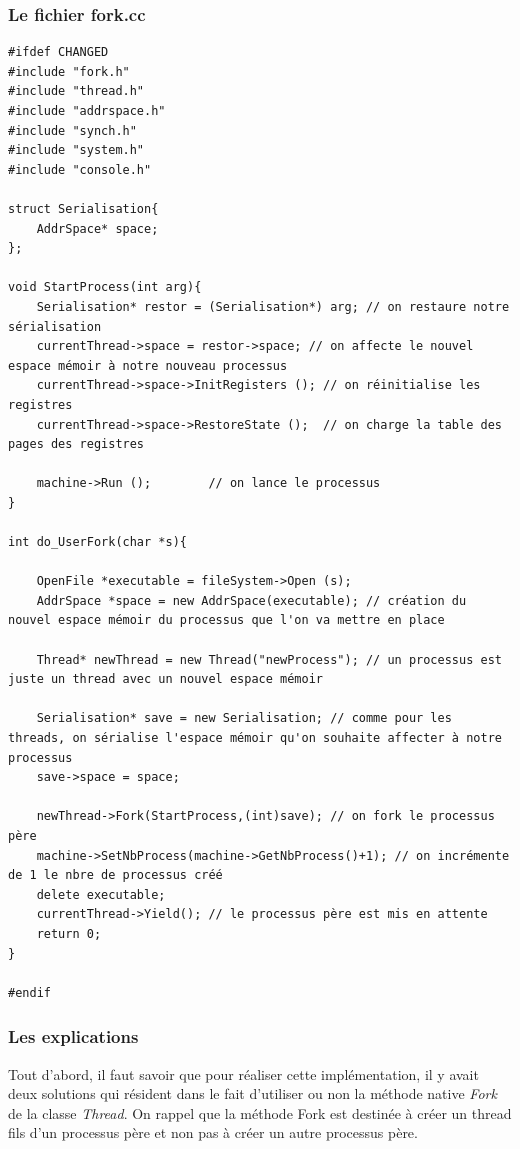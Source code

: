 \documentclass[a4paper,10pt]{article}
\begin{document}
    \newpage
    \textcolor{TealBlue}{\subsubsection*{Le fichier fork.cc}}
    \begin{lstlisting}
#ifdef CHANGED
#include "fork.h"
#include "thread.h"
#include "addrspace.h"
#include "synch.h"
#include "system.h"
#include "console.h"

struct Serialisation{
	AddrSpace* space;
};

void StartProcess(int arg){
	Serialisation* restor = (Serialisation*) arg; // on restaure notre sérialisation 
	currentThread->space = restor->space; // on affecte le nouvel espace mémoir à notre nouveau processus
	currentThread->space->InitRegisters ();	// on réinitialise les registres
	currentThread->space->RestoreState ();	// on charge la table des pages des registres

	machine->Run ();		// on lance le processus
}

int do_UserFork(char *s){

	OpenFile *executable = fileSystem->Open (s);
	AddrSpace *space = new AddrSpace(executable); // création du nouvel espace mémoir du processus que l'on va mettre en place

	Thread* newThread = new Thread("newProcess"); // un processus est juste un thread avec un nouvel espace mémoir
  
	Serialisation* save = new Serialisation; // comme pour les threads, on sérialise l'espace mémoir qu'on souhaite affecter à notre processus
	save->space = space;

	newThread->Fork(StartProcess,(int)save); // on fork le processus père
	machine->SetNbProcess(machine->GetNbProcess()+1); // on incrémente de 1 le nbre de processus créé
	delete executable;
	currentThread->Yield(); // le processus père est mis en attente
	return 0;
}

#endif 

    \end{lstlisting}
    \newpage
  \textcolor{TealBlue}{\subsubsection*{Les explications}}
    Tout d'abord, il faut savoir que pour réaliser cette implémentation, il y avait deux solutions qui résident dans le fait d'utiliser ou non la méthode
    native \emph{Fork} de la classe \emph{Thread}. On rappel que la méthode Fork est destinée à créer un thread fils d'un processus père et non pas à 
    créer un autre processus père. 
    
\end{document}
